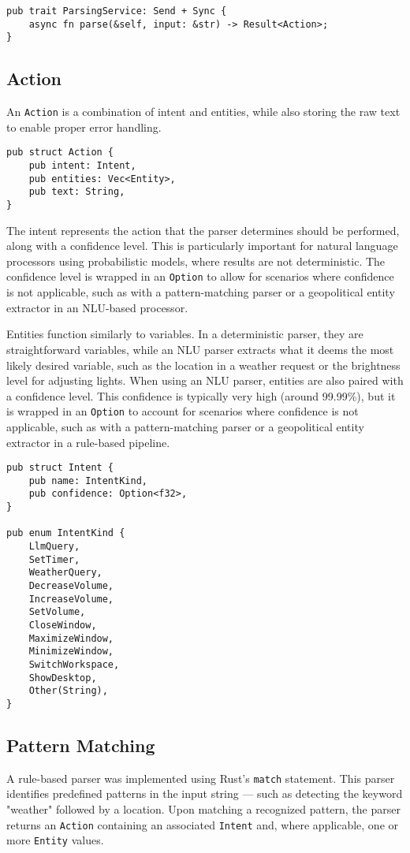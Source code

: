 \begin{verbatim}
pub trait ParsingService: Send + Sync {
    async fn parse(&self, input: &str) -> Result<Action>;
}
\end{verbatim}

\subsection{Action}
An \texttt{Action} is a combination of intent and entities, while also storing the raw text to enable proper error handling.

\begin{verbatim}
pub struct Action {
    pub intent: Intent,
    pub entities: Vec<Entity>,
    pub text: String,
}
\end{verbatim}

The intent represents the action that the parser determines should be performed, along with a confidence level.
This is particularly important for natural language processors using probabilistic models,
where results are not deterministic.
The confidence level is wrapped in an \texttt{Option} to allow for scenarios where confidence is not applicable,
such as with a pattern-matching parser or a geopolitical entity extractor in an NLU-based processor.

Entities function similarly to variables. In a deterministic parser, they are straightforward variables,
while an NLU parser extracts what it deems the most likely desired variable,
such as the location in a weather request or the brightness level for adjusting lights.
When using an NLU parser, entities are also paired with a confidence level.
This confidence is typically very high (around 99.99\%), but it is wrapped in an \texttt{Option}
to account for scenarios where confidence is not applicable,
such as with a pattern-matching parser or a geopolitical entity extractor in a rule-based pipeline.

\begin{verbatim}
pub struct Intent {
    pub name: IntentKind,
    pub confidence: Option<f32>,
}

pub enum IntentKind {
    LlmQuery,
    SetTimer,
    WeatherQuery,
    DecreaseVolume,
    IncreaseVolume,
    SetVolume,
    CloseWindow,
    MaximizeWindow,
    MinimizeWindow,
    SwitchWorkspace,
    ShowDesktop,
    Other(String),
}
\end{verbatim}

\subsection{Pattern Matching}
A rule-based parser was implemented using Rust's \texttt{match} statement.
This parser identifies predefined patterns in the input string --- such as detecting the keyword "weather" followed by a location.
Upon matching a recognized pattern, the parser returns an \texttt{Action} containing an associated \texttt{Intent}
and, where applicable, one or more \texttt{Entity} values.

